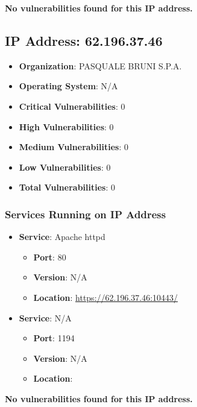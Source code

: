 \documentclass{article}
\begin{document}
\textbf{No vulnerabilities found for this IP address.}




\clearpage



\subsection{IP Address: 62.196.37.46}

\begin{itemize}
    \item \textbf{Organization}: PASQUALE BRUNI S.P.A.
    \item \textbf{Operating System}:  N/A 
    \item \textbf{Critical Vulnerabilities}: 0
    \item \textbf{High Vulnerabilities}: 0
    \item \textbf{Medium Vulnerabilities}: 0
    \item \textbf{Low Vulnerabilities}: 0
    \item \textbf{Total Vulnerabilities}: 0
\end{itemize}

\subsubsection*{Services Running on IP Address}

\begin{itemize}
    
        \item \textbf{Service}: Apache httpd
        \begin{itemize}
            \item \textbf{Port}: 80
            \item \textbf{Version}:  N/A 
            \item \textbf{Location}: \href{ https://62.196.37.46:10443/ }{ https://62.196.37.46:10443/ }
        \end{itemize}
    
        \item \textbf{Service}: N/A
        \begin{itemize}
            \item \textbf{Port}: 1194
            \item \textbf{Version}:  N/A 
            \item \textbf{Location}: \href{  }{  }
        \end{itemize}
    
\end{itemize}


\textbf{No vulnerabilities found for this IP address.}




\clearpage
\end{document}
